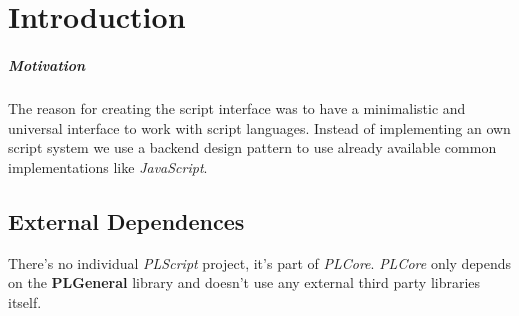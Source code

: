 \chapter{Introduction}


\paragraph{Motivation}
The reason for creating the script interface was to have a minimalistic and universal interface to work with script languages. Instead of implementing an own script system we use a backend design pattern to use already available common implementations like \emph{JavaScript}.


\section{External Dependences}
There's no individual \emph{PLScript} project, it's part of \emph{PLCore}. \emph{PLCore} only depends on the \textbf{PLGeneral} library and doesn't use any external third party libraries itself.
